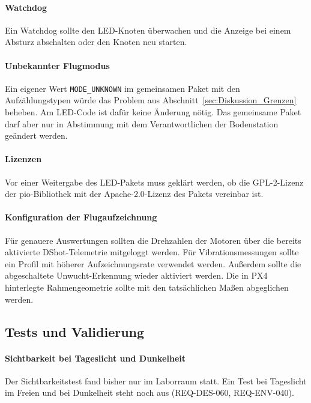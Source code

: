     \paragraph{Watchdog}
    Ein Watchdog sollte den LED-Knoten überwachen und die Anzeige bei einem Absturz abschalten oder den Knoten neu
    starten.

    \paragraph{Unbekannter Flugmodus}
    Ein eigener Wert \texttt{MODE\_UNKNOWN} im gemeinsamen Paket mit den Aufzählungstypen würde das Problem aus
    Abschnitt~\ref{sec:Diskussion_Grenzen} beheben.
    Am LED-Code ist dafür keine Änderung nötig.
    Das gemeinsame Paket darf aber nur in Abstimmung mit dem Verantwortlichen der Bodenstation geändert werden.

    \paragraph{Lizenzen}
    Vor einer Weitergabe des LED-Pakets muss geklärt werden, ob die GPL-2-Lizenz der \gls{pio}-Bibliothek mit der
    Apache-2.0-Lizenz des Pakets vereinbar ist.

    \paragraph{Konfiguration der Flugaufzeichnung}
    Für genauere Auswertungen sollten die Drehzahlen der Motoren über die bereits aktivierte DShot-Telemetrie
    mitgeloggt werden.
    Für Vibrationsmessungen sollte ein Profil mit höherer Aufzeichnungsrate verwendet werden.
    Außerdem sollte die abgeschaltete Unwucht-Erkennung wieder aktiviert werden.
    Die in PX4 hinterlegte Rahmengeometrie sollte mit den tatsächlichen Maßen abgeglichen werden.

    \subsection{Tests und Validierung}
    \label{sec:Ausblick_Tests}

    \paragraph{Sichtbarkeit bei Tageslicht und Dunkelheit}
    Der Sichtbarkeitstest fand bisher nur im Laborraum statt.
    Ein Test bei Tageslicht im Freien und bei Dunkelheit steht noch aus (REQ-DES-060, REQ-ENV-040).


